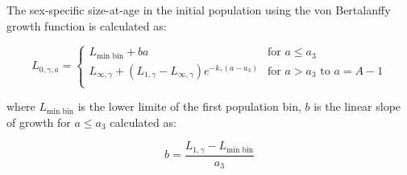 \documentclass[11pt,
  english,
  letterpaper,
]{article}
\begin{document}
\leavevmode\tagmcend\tagstructend\par


The sex-specific size-at-age in the initial population using the von Bertalanffy growth function is calculated as:

\leavevmode\tagmcend\tagstructend\par


\begin{equation}
\label{eqn5}
L_{0,\gamma,a} = 
\begin{cases}
L_{\text{min bin}} + ba & \text{for $a \leq a_3$} \\
L_{\infty,\gamma} + (L_{1,\gamma} - L_{\infty,\gamma})e^{-k_{\gamma}(a-a_3)} & \text{for $a>a_3$ to $a=A-1$}\\
\end{cases}
\end{equation}

\leavevmode\tagmcend\tagstructend\par


where {\(L_{\text{min bin}}\)\leavevmode\tagmcend\tagstructend} is the lower limite of the first population bin, {\(b\)\leavevmode\tagmcend\tagstructend} is the linear slope of growth for {\(a \leq a_3\)\leavevmode\tagmcend\tagstructend} calculated as:

\leavevmode\tagmcend\tagstructend\par


\begin{equation}
\label{eqn6}
b = \frac{L_{1,\gamma} - L_{\text{min bin}}}{a_3}
\end{equation}

\leavevmode\tagmcend\tagstructend\par

\end{document}
